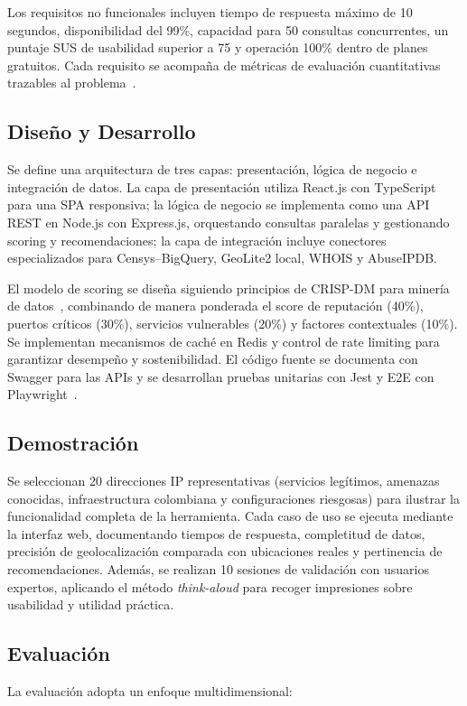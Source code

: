 Los requisitos no funcionales incluyen tiempo de respuesta máximo de 10 segundos, disponibilidad del 99\%, capacidad para 50 consultas concurrentes, un puntaje SUS de usabilidad superior a 75 y operación 100\% dentro de planes gratuitos. Cada requisito se acompaña de métricas de evaluación cuantitativas trazables al problema~\cite{Winter2008}.

\subsection{Diseño y Desarrollo}
Se define una arquitectura de tres capas: presentación, lógica de negocio e integración de datos. La capa de presentación utiliza React.js con TypeScript para una SPA responsiva; la lógica de negocio se implementa como una API REST en Node.js con Express.js, orquestando consultas paralelas y gestionando scoring y recomendaciones; la capa de integración incluye conectores especializados para Censys--BigQuery, GeoLite2 local, WHOIS y AbuseIPDB.

El modelo de scoring se diseña siguiendo principios de CRISP-DM para minería de datos~\cite{Wirth2000}, combinando de manera ponderada el score de reputación (40\%), puertos críticos (30\%), servicios vulnerables (20\%) y factores contextuales (10\%). Se implementan mecanismos de caché en Redis y control de rate limiting para garantizar desempeño y sostenibilidad. El código fuente se documenta con Swagger para las APIs y se desarrollan pruebas unitarias con Jest y E2E con Playwright~\cite{Schroer2021}.

\subsection{Demostración}
Se seleccionan 20 direcciones IP representativas (servicios legítimos, amenazas conocidas, infraestructura colombiana y configuraciones riesgosas) para ilustrar la funcionalidad completa de la herramienta. Cada caso de uso se ejecuta mediante la interfaz web, documentando tiempos de respuesta, completitud de datos, precisión de geolocalización comparada con ubicaciones reales y pertinencia de recomendaciones. Además, se realizan 10 sesiones de validación con usuarios expertos, aplicando el método \textit{think-aloud} para recoger impresiones sobre usabilidad y utilidad práctica.

\subsection{Evaluación}
La evaluación adopta un enfoque multidimensional:

